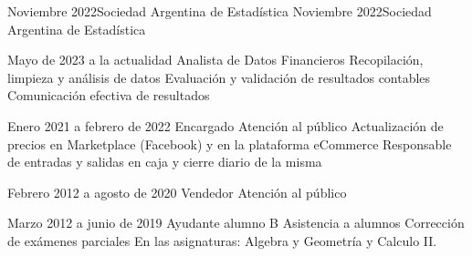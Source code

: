 \documentclass{CV_template}
\begin{document}
\begin{paracol}{2}
\begin{rightcolumn}


            {Noviembre 2022}{Sociedad Argentina de Estadística}
            {Noviembre 2022}{Sociedad Argentina de Estadística}



    {Mayo de 2023 a la actualidad}
    {Analista de Datos Financieros}
    {Recopilación, limpieza y análisis de datos}
    {Evaluación y validación de resultados contables}
    {Comunicación efectiva de resultados}
    {}

    {Enero 2021 a febrero de 2022}
    {Encargado}
    {Atención al público}
    {
        }
    {Actualización de precios en Marketplace (Facebook) y en la plataforma eCommerce}
    {Responsable de entradas y salidas en caja y cierre diario de la misma}
    
    {Febrero 2012 a agosto de 2020}
    {Vendedor}
    {Atención al público}
    {
     }
    {}{}
    
    {Marzo 2012 a junio de 2019}
    {Ayudante alumno B}
    {Asistencia a alumnos}
    {Corrección de exámenes parciales}
    {En las asignaturas: 
     Algebra y Geometría y Calculo II.}
    {}


\end{rightcolumn}

\end{paracol}
\end{document}
